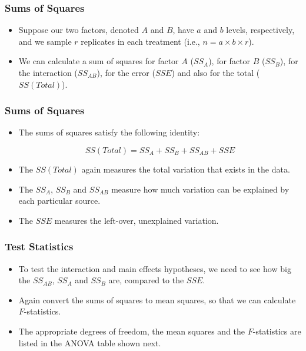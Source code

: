 \documentclass[12pt]{beamer}
\begin{document}
\begin{frame}
	\frametitle{Sums of Squares}
	
	\begin{itemize}[label={\color{blue}$\blacktriangleright$}]
		\item Suppose our two factors, denoted $A$ and $B$, have $a$ and $b$ levels, respectively, and we sample $r$ replicates in each treatment (i.e., $n = a \times b \times r$).
		
		\item We can calculate a sum of squares for factor $A$ ($SS_A$), for factor $B$ ($SS_B$), for the interaction ($SS_{AB}$), for the error ($SSE$) and also for the total ($SS(Total)$).
		
		\end{itemize}
	
\end{frame}
\begin{frame}
	\frametitle{Sums of Squares}
	
	\begin{itemize}[label={\color{blue}$\blacktriangleright$}]
		\item The sums of squares satisfy the following identity:
		
		\vspace{0.3cm}
		\[SS(Total) = SS_A + SS_B + SS_{AB} + SSE\]
		\vspace{0.3cm}
		
		\item The $SS(Total)$ again measures the total variation that exists in the data.
		
		\item The $SS_A$, $SS_B$ and $SS_{AB}$ measure how much variation can be explained by each particular source.
		
		\item The $SSE$ measures the left-over, unexplained variation.
	\end{itemize}
	
\end{frame}
\begin{frame}
	\frametitle{Test Statistics}
	
	\begin{itemize}[label={\color{blue}$\blacktriangleright$}]
		\item To test the interaction and main effects hypotheses, we need to see how big the $SS_{AB}$, $SS_A$ and $SS_B$ are, compared to the $SSE$.
		
		\item Again convert the sums of squares to mean squares, so that we can calculate $F$-statistics.
		
		\item The appropriate degrees of freedom, the mean squares and the $F$-statistics are listed in the ANOVA table shown next.
	\end{itemize}
	
\end{frame}
\end{document}

